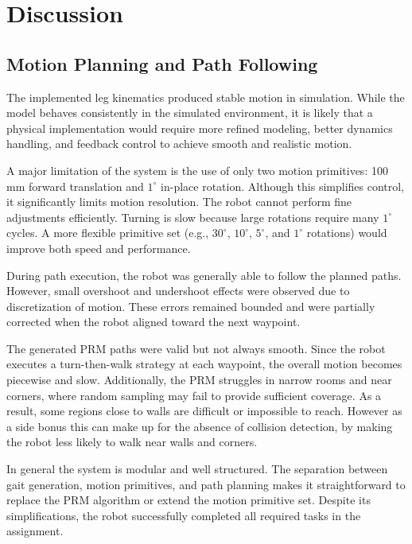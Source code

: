 \documentclass[a4paper,12pt]{article}
\begin{document}


\section{Discussion}
\subsection{Motion Planning and Path Following}

The implemented leg kinematics produced stable motion in simulation. While the
model behaves consistently in the simulated environment, it is likely
that a physical implementation would require more refined modeling,
better dynamics handling, and feedback control to achieve smooth and
realistic motion.

A major limitation of the system is the use of only two motion
primitives: 100\,mm forward translation and $1^\circ$ in-place rotation.
Although this simplifies control, it significantly limits motion
resolution. The robot cannot perform fine adjustments efficiently.
Turning is slow because large rotations require many
$1^\circ$ cycles. A more flexible primitive set (e.g., $30^\circ$,
$10^\circ$, $5^\circ$, and $1^\circ$ rotations) would improve both
speed and performance.

During path execution, the robot was generally able to follow the
planned paths. However, small overshoot and undershoot effects were
observed due to discretization of motion. These errors remained bounded
and were partially corrected when the robot aligned toward the next
waypoint.

The generated PRM paths were valid but not always smooth. Since the
robot executes a turn-then-walk strategy at each waypoint, the overall
motion becomes piecewise and slow. Additionally, the PRM struggles in narrow rooms and near
corners, where random sampling may fail to provide sufficient coverage.
As a result, some regions close to walls are difficult or impossible
to reach. However as a side bonus this can make up for the absence of collision detection,
by making the robot less likely to walk near walls and corners.

In general the system is modular and well structured.
The separation between gait generation, motion primitives, and path
planning makes it straightforward to replace the PRM algorithm or
extend the motion primitive set. Despite its simplifications, the robot
successfully completed all required tasks in the assignment.
\end{document}
